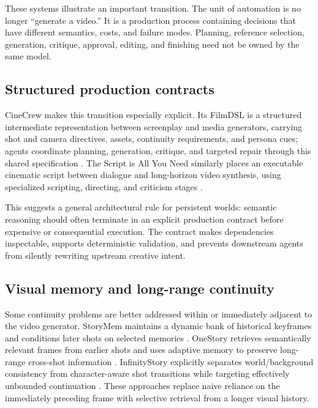\documentclass{article}
\begin{document}
These systems illustrate an important transition. The unit of automation is no longer “generate a video.” It is a production process containing decisions that have different semantics, costs, and failure modes. Planning, reference selection, generation, critique, approval, editing, and finishing need not be owned by the same model.

\subsection{Structured production contracts}

CineCrew makes this transition especially explicit. Its FilmDSL is a structured intermediate representation between screenplay and media generators, carrying shot and camera directives, assets, continuity requirements, and persona cues; agents coordinate planning, generation, critique, and targeted repair through this shared specification \citep{chen2026cinecrew}. The Script is All You Need similarly places an executable cinematic script between dialogue and long-horizon video synthesis, using specialized scripting, directing, and criticism stages \citep{mu2026script}.

This suggests a general architectural rule for persistent worlds: semantic reasoning should often terminate in an explicit production contract before expensive or consequential execution. The contract makes dependencies inspectable, supports deterministic validation, and prevents downstream agents from silently rewriting upstream creative intent.

\subsection{Visual memory and long-range continuity}

Some continuity problems are better addressed within or immediately adjacent to the video generator. StoryMem maintains a dynamic bank of historical keyframes and conditions later shots on selected memories \citep{zhang2025storymem}. OneStory retrieves semantically relevant frames from earlier shots and uses adaptive memory to preserve long-range cross-shot information \citep{an2025onestory}. InfinityStory explicitly separates world/background consistency from character-aware shot transitions while targeting effectively unbounded continuation \citep{elmoghany2026infinitystory}. These approaches replace naive reliance on the immediately preceding frame with selective retrieval from a longer visual history.
\end{document}
